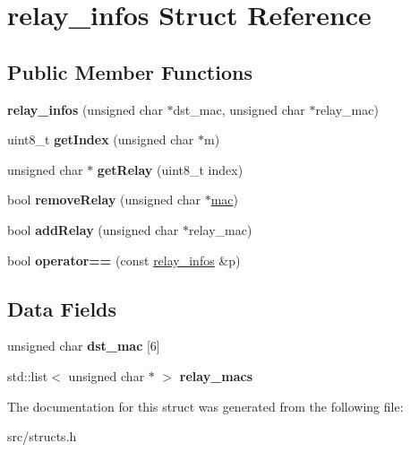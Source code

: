 \hypertarget{structrelay__infos}{\section{relay\-\_\-infos Struct Reference}
\label{structrelay__infos}
}
\subsection*{Public Member Functions}
\begin{DoxyCompactItemize}
\item 
\hypertarget{structrelay__infos_a33500579063dc8797704e09e7a402ae4}{{\bfseries relay\-\_\-infos} (unsigned char $\ast$dst\-\_\-mac, unsigned char $\ast$relay\-\_\-mac)}\label{structrelay__infos_a33500579063dc8797704e09e7a402ae4}

\item 
\hypertarget{structrelay__infos_a19c521440efcd14ddb2fb91244679312}{uint8\-\_\-t {\bfseries get\-Index} (unsigned char $\ast$m)}\label{structrelay__infos_a19c521440efcd14ddb2fb91244679312}

\item 
\hypertarget{structrelay__infos_aa8763c29eaff9b5c3dbb39598ae7bc33}{unsigned char $\ast$ {\bfseries get\-Relay} (uint8\-\_\-t index)}\label{structrelay__infos_aa8763c29eaff9b5c3dbb39598ae7bc33}

\item 
\hypertarget{structrelay__infos_ae9dbf123ee48d44156c4fb26ab5c051d}{bool {\bfseries remove\-Relay} (unsigned char $\ast$\hyperlink{structmac}{mac})}\label{structrelay__infos_ae9dbf123ee48d44156c4fb26ab5c051d}

\item 
\hypertarget{structrelay__infos_ac5f8436c908584796d7355e2ca977c10}{bool {\bfseries add\-Relay} (unsigned char $\ast$relay\-\_\-mac)}\label{structrelay__infos_ac5f8436c908584796d7355e2ca977c10}

\item 
\hypertarget{structrelay__infos_acd0eb315eb579c0f518d149523bdad8d}{bool {\bfseries operator==} (const \hyperlink{structrelay__infos}{relay\-\_\-infos} \&p)}\label{structrelay__infos_acd0eb315eb579c0f518d149523bdad8d}

\end{DoxyCompactItemize}
\subsection*{Data Fields}
\begin{DoxyCompactItemize}
\item 
\hypertarget{structrelay__infos_a1d699cb5c8f7253a36545792a9c2b571}{unsigned char {\bfseries dst\-\_\-mac} \mbox{[}6\mbox{]}}\label{structrelay__infos_a1d699cb5c8f7253a36545792a9c2b571}

\item 
\hypertarget{structrelay__infos_acb982996b57e0112c1a7a8a6b248c75a}{std\-::list$<$ unsigned char $\ast$ $>$ {\bfseries relay\-\_\-macs}}\label{structrelay__infos_acb982996b57e0112c1a7a8a6b248c75a}

\end{DoxyCompactItemize}


The documentation for this struct was generated from the following file\-:\begin{DoxyCompactItemize}
\item 
src/structs.\-h\end{DoxyCompactItemize}
